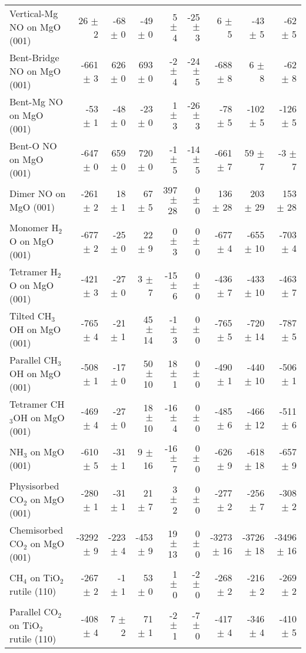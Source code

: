 \begin{table}
\begin{adjustbox}{center,max width=0.9\textwidth}
\begin{tabular}{lrrrrrrrr}
Vertical-Mg NO on MgO (001) & 26 $\pm$ 2 & -68 $\pm$ 0 & -49 $\pm$ 0 & 5 $\pm$ 4 & -25 $\pm$ 3 & 6 $\pm$ 5 & -43 $\pm$ 5 & -62 $\pm$ 5 \\
Bent-Bridge NO on MgO (001) & -661 $\pm$ 3 & 626 $\pm$ 0 & 693 $\pm$ 0 & -2 $\pm$ 4 & -24 $\pm$ 5 & -688 $\pm$ 8 & 6 $\pm$ 8 & -62 $\pm$ 8 \\
Bent-Mg NO on MgO (001) & -53 $\pm$ 1 & -48 $\pm$ 0 & -23 $\pm$ 0 & 1 $\pm$ 3 & -26 $\pm$ 3 & -78 $\pm$ 5 & -102 $\pm$ 5 & -126 $\pm$ 5 \\
Bent-O NO on MgO (001) & -647 $\pm$ 0 & 659 $\pm$ 0 & 720 $\pm$ 0 & -1 $\pm$ 5 & -14 $\pm$ 5 & -661 $\pm$ 7 & 59 $\pm$ 7 & -3 $\pm$ 7 \\
Dimer NO on MgO (001) & -261 $\pm$ 2 & 18 $\pm$ 1 & 67 $\pm$ 5 & 397 $\pm$ 28 & 0 $\pm$ 0 & 136 $\pm$ 28 & 203 $\pm$ 29 & 153 $\pm$ 28 \\
Monomer H$_2$O on MgO (001) & -677 $\pm$ 2 & -25 $\pm$ 0 & 22 $\pm$ 9 & 0 $\pm$ 3 & 0 $\pm$ 0 & -677 $\pm$ 4 & -655 $\pm$ 10 & -703 $\pm$ 4 \\
Tetramer H$_2$O on MgO (001) & -421 $\pm$ 3 & -27 $\pm$ 0 & 3 $\pm$ 7 & -15 $\pm$ 6 & 0 $\pm$ 0 & -436 $\pm$ 7 & -433 $\pm$ 10 & -463 $\pm$ 7 \\
Tilted CH$_3$OH on MgO (001) & -765 $\pm$ 4 & -21 $\pm$ 1 & 45 $\pm$ 14 & -1 $\pm$ 3 & 0 $\pm$ 0 & -765 $\pm$ 5 & -720 $\pm$ 14 & -787 $\pm$ 5 \\
Parallel CH$_3$OH on MgO (001) & -508 $\pm$ 1 & -17 $\pm$ 0 & 50 $\pm$ 10 & 18 $\pm$ 1 & 0 $\pm$ 0 & -490 $\pm$ 1 & -440 $\pm$ 10 & -506 $\pm$ 1 \\
Tetramer CH$_3$OH on MgO (001) & -469 $\pm$ 4 & -27 $\pm$ 0 & 18 $\pm$ 10 & -16 $\pm$ 4 & 0 $\pm$ 0 & -485 $\pm$ 6 & -466 $\pm$ 12 & -511 $\pm$ 6 \\
NH$_3$ on MgO (001) & -610 $\pm$ 5 & -31 $\pm$ 1 & 9 $\pm$ 16 & -16 $\pm$ 7 & 0 $\pm$ 0 & -626 $\pm$ 9 & -618 $\pm$ 18 & -657 $\pm$ 9 \\
Physisorbed CO$_2$ on MgO (001) & -280 $\pm$ 1 & -31 $\pm$ 1 & 21 $\pm$ 7 & 3 $\pm$ 2 & 0 $\pm$ 0 & -277 $\pm$ 2 & -256 $\pm$ 7 & -308 $\pm$ 2 \\
Chemisorbed CO$_2$ on MgO (001) & -3292 $\pm$ 9 & -223 $\pm$ 4 & -453 $\pm$ 9 & 19 $\pm$ 13 & 0 $\pm$ 0 & -3273 $\pm$ 16 & -3726 $\pm$ 18 & -3496 $\pm$ 16 \\
CH$_4$ on TiO$_2$ rutile (110) & -267 $\pm$ 2 & -1 $\pm$ 1 & 53 $\pm$ 0 & 1 $\pm$ 0 & -2 $\pm$ 0 & -268 $\pm$ 2 & -216 $\pm$ 2 & -269 $\pm$ 2 \\
Parallel CO$_2$ on TiO$_2$ rutile (110) & -408 $\pm$ 4 & 7 $\pm$ 2 & 71 $\pm$ 1 & -2 $\pm$ 1 & -7 $\pm$ 0 & -417 $\pm$ 4 & -346 $\pm$ 4 & -410 $\pm$ 5 \\

\end{tabular}
\end{adjustbox}
\end{table}
